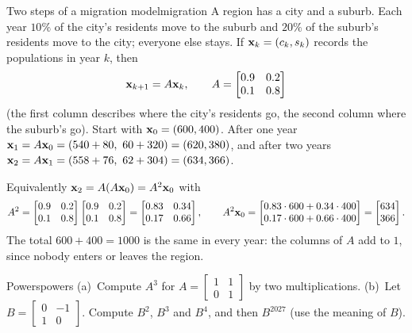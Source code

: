 \documentclass[11pt]{article}
\begin{document}
\begin{exmp}{Two steps of a migration model}{migration}
A region has a city and a suburb. Each year $10\%$ of the city's residents move to the suburb and $20\%$ of the suburb's residents move to the city; everyone else stays. If $\mathbf{x}_k=(c_k,s_k)$ records the populations in year $k$, then
\[
\mathbf{x}_{k+1}=A\mathbf{x}_k,\qquad A=\begin{bmatrix}0.9&0.2\\0.1&0.8\end{bmatrix}
\]
(the first column describes where the city's residents go, the second column where the suburb's go). Start with $\mathbf{x}_0=(600,400)$. After one year $\bv{x}_1=A\bv{x}_0=(540+80,\ 60+320)=(620,380)$, and after two years $\bv{x}_2=A\bv{x}_1=(558+76,\ 62+304)=(634,366)$.

Equivalently $\mathbf{x}_2=A(A\mathbf{x}_0)=A^2\mathbf{x}_0$ with
\[
A^2=\begin{bmatrix}0.9&0.2\\0.1&0.8\end{bmatrix}\begin{bmatrix}0.9&0.2\\0.1&0.8\end{bmatrix}=\begin{bmatrix}0.83&0.34\\0.17&0.66\end{bmatrix},\qquad A^2\mathbf{x}_0=\begin{bmatrix}0.83\cdot600+0.34\cdot400\\0.17\cdot600+0.66\cdot400\end{bmatrix}=\begin{bmatrix}634\\366\end{bmatrix}.
\]
The total $600+400=1000$ is the same in every year: the columns of $A$ add to $1$, since nobody enters or leaves the region.
\end{exmp}

\begin{kc}{Powers}{powers}
(a)~Compute $A^3$ for $A=\begin{bmatrix}1&1\\0&1\end{bmatrix}$ by two multiplications. (b)~Let $B=\begin{bmatrix}0&-1\\1&0\end{bmatrix}$. Compute $B^2$, $B^3$ and $B^4$, and then $B^{2027}$ (use the meaning of $B$).
\end{kc}
\end{document}
